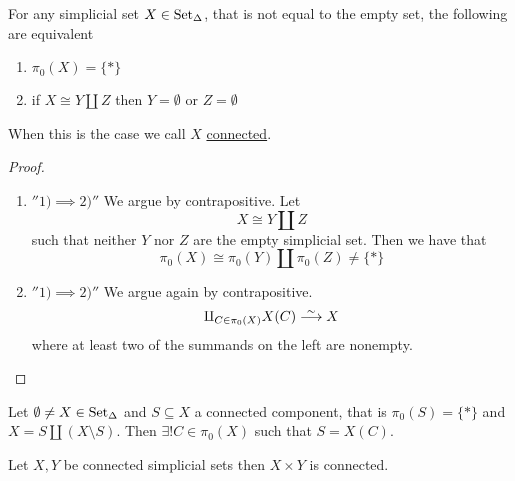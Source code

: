 \begin{prop}
    For any simplicial set $X \in \operatorname{Set}_{\Delta}$, that is not equal to the empty set, the following are equivalent 
    \begin{enumerate}
        \item 
        $\pi_0(X)=\{*\}$
        \item 
        if $X \cong Y \amalg Z$ then $Y = \emptyset$ or $Z = \emptyset$
    \end{enumerate}
    When this is the case we call $X$ \underline{connected}.
\end{prop}

\begin{proof}
    \begin{enumerate}
        \item 
        $''1)\implies2)''$
        We argue by contrapositive. 
        Let
        \[
        X \cong Y \amalg Z
        \] 
        such that neither $Y$ nor $Z$ are the empty simplicial set.
        Then we have that 
        \[
        \pi_0(X) \cong \pi_0(Y) \amalg \pi_0(Z) \neq \{ *\}
        \]
        \item 
        $''1)\implies2)''$
        We argue again by contrapositive. 
        \[
        \amalg_{C \in \pi_0(X)} X(C) \isomorphism X
        \]
        where at least two of the summands on the left are nonempty.
    \end{enumerate}
\end{proof}

\begin{prop}
    Let $\emptyset \neq X \in \operatorname{Set}_{\Delta}$ and $S\subseteq X$ a connected component, that is $\pi_0(S)=\{*\}$ and $X=S \amalg (X \setminus S)$.
    Then $\exists!C \in \pi_0(X)$ such that $S=X(C)$.
\end{prop}

\begin{prop}
    Let $X,Y$ be connected simplicial sets then $X  \times Y$ is connected. 
\end{prop}

